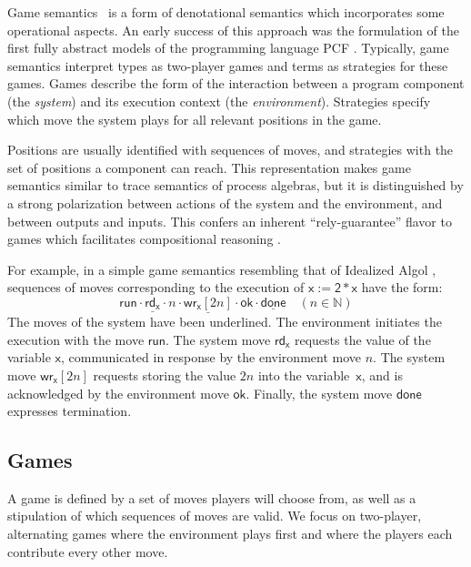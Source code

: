 \documentclass[draft,11pt]{report}
\theoremstyle{definition}
\newcommand{\kw}[1]{\ensuremath{ \mathsf{#1} }}
\begin{document}
Game semantics~\citep{gsll,gamesem99}
is a form of denotational semantics which
incorporates some operational aspects.
An early success of this approach was
the formulation of the first fully abstract models
of the programming language PCF \citep{pcfajm,pcfho}.
Typically,
game semantics interpret
types as two-player games
and terms as strategies for these games.
Games describe the form of the interaction
between a program component %
(the \emph{system})
and its execution context
(the \emph{environment}).
Strategies
specify which move the system plays
for all relevant positions in the game.

Positions are usually identified with sequences of moves,
and strategies with the set of positions
a component can reach.
This representation makes
game semantics similar to
trace semantics of process algebras,
but it is distinguished
by a strong polarization between
actions of the system and the environment,
and between outputs and inputs.
This confers an inherent ``rely-guarantee'' flavor
to games which facilitates compositional reasoning
\citep{cspgs}.

For example,
in a simple game semantics resembling that of
Idealized Algol \citep{gsia},
sequences of moves corresponding to
the execution of $\kw{x := 2 * x}$
have the form:
\[
    \kw{run} \cdot
    \underline{\kw{rd}_\kw{x}} \cdot n \cdot
    \underline{\kw{wr}_\kw{x}[2n]} \cdot \kw{ok} \cdot
    \underline{\kw{done}} \quad (n \in \mathbb{N})
\]
The moves of the system have been underlined.
The environment initiates the execution with
the move $\kw{run}$.
The system move $\kw{rd}_\kw{x}$ requests
the value of the variable $\kw{x}$,
communicated in response by the environment move $n$.
The system move $\kw{wr}_\kw{x}[2n]$ requests
storing the value $2n$ into the variable~$\kw{x}$,
and is acknowledged by the environment move $\kw{ok}$.
Finally, the system move $\kw{done}$
expresses termination.


\subsection{Games} \label{sec:mainideas:gs:games} %

A game is defined by a set of moves
players will choose from,
as well as a stipulation of which
sequences of moves are valid.
We focus on two-player, alternating games
where the environment plays first and
where the players
each contribute every other move.
\end{document}
